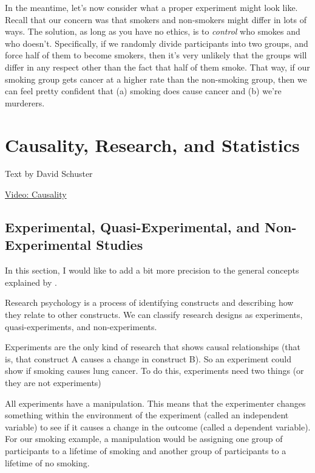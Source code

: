 \documentclass[
]{book}
\begin{document}
In the meantime, let's now consider what a proper experiment might look like. Recall that our concern was that smokers and non-smokers might differ in lots of ways. The solution, as long as you have no ethics, is to \emph{control} who smokes and who doesn't. Specifically, if we randomly divide participants into two groups, and force half of them to become smokers, then it's very unlikely that the groups will differ in any respect other than the fact that half of them smoke. That way, if our smoking group gets cancer at a higher rate than the non-smoking group, then we can feel pretty confident that (a) smoking does cause cancer and (b) we're murderers.

\hypertarget{causality-research-and-statistics}{%
\section{Causality, Research, and Statistics}\label{causality-research-and-statistics}}

Text by David Schuster

\href{https://youtu.be/s9itzrOlnq4}{Video: Causality}

\hypertarget{experimental-quasi-experimental-and-non-experimental-studies}{%
\subsection{Experimental, Quasi-Experimental, and Non-Experimental Studies}\label{experimental-quasi-experimental-and-non-experimental-studies}}

In this section, I would like to add a bit more precision to the general concepts explained by \citet{Navarro2018}.

Research psychology is a process of identifying constructs and describing how they relate to other constructs. We can classify research designs as experiments, quasi-experiments, and non-experiments.

Experiments are the only kind of research that shows causal relationships (that is, that construct A causes a change in construct B). So an experiment could show if smoking causes lung cancer. To do this, experiments need two things (or they are not experiments)

All experiments have a manipulation. This means that the experimenter changes something within the environment of the experiment (called an independent variable) to see if it causes a change in the outcome (called a dependent variable). For our smoking example, a manipulation would be assigning one group of participants to a lifetime of smoking and another group of participants to a lifetime of no smoking.
\end{document}
